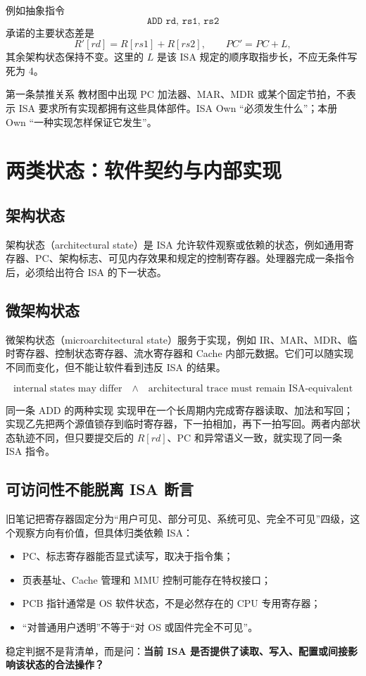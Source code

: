 \documentclass[UTF8,fontset=fandol,11pt,a4paper]{ctexart}
\newcommand{\kw}[1]{\textbf{\color{deep}#1}}
\newcommand{\code}[1]{\texttt{#1}}
\begin{document}
例如抽象指令
\[
\code{ADD rd, rs1, rs2}
\]
承诺的主要状态差是
\[
R'[rd]=R[rs1]+R[rs2],\qquad PC'=PC+L,
\]
其余架构状态保持不变。这里的 $L$ 是该 ISA 规定的顺序取指步长，不应无条件写死为 4。

\begin{warnbox}{第一条禁推关系}
教材图中出现 PC 加法器、MAR、MDR 或某个固定节拍，不表示 ISA 要求所有实现都拥有这些具体部件。ISA Own ``必须发生什么''；本册 Own ``一种实现怎样保证它发生''。
\end{warnbox}

\section{两类状态：软件契约与内部实现}

\subsection{架构状态}

架构状态（architectural state）是 ISA 允许软件观察或依赖的状态，例如通用寄存器、PC、架构标志、可见内存效果和规定的控制寄存器。处理器完成一条指令后，必须给出符合 ISA 的下一状态。

\subsection{微架构状态}

微架构状态（microarchitectural state）服务于实现，例如 IR、MAR、MDR、临时寄存器、控制状态寄存器、流水寄存器和 Cache 内部元数据。它们可以随实现不同而变化，但不能让软件看到违反 ISA 的结果。

\[
\boxed{
\text{internal states may differ}
\quad\land\quad
\text{architectural trace must remain ISA-equivalent}
}
\]

\begin{examplebox}{同一条 ADD 的两种实现}
实现甲在一个长周期内完成寄存器读取、加法和写回；实现乙先把两个源值锁存到临时寄存器，下一拍相加，再下一拍写回。两者内部状态轨迹不同，但只要提交后的 $R[rd]$、PC 和异常语义一致，就实现了同一条 ISA 指令。
\end{examplebox}

\subsection{可访问性不能脱离 ISA 断言}

旧笔记把寄存器固定分为“用户可见、部分可见、系统可见、完全不可见”四级，这个观察方向有价值，但具体归类依赖 ISA：
\begin{itemize}
  \item PC、标志寄存器能否显式读写，取决于指令集；
  \item 页表基址、Cache 管理和 MMU 控制可能存在特权接口；
  \item PCB 指针通常是 OS 软件状态，不是必然存在的 CPU 专用寄存器；
  \item “对普通用户透明”不等于“对 OS 或固件完全不可见”。
\end{itemize}
稳定判据不是背清单，而是问：\kw{当前 ISA 是否提供了读取、写入、配置或间接影响该状态的合法操作？}
\end{document}
